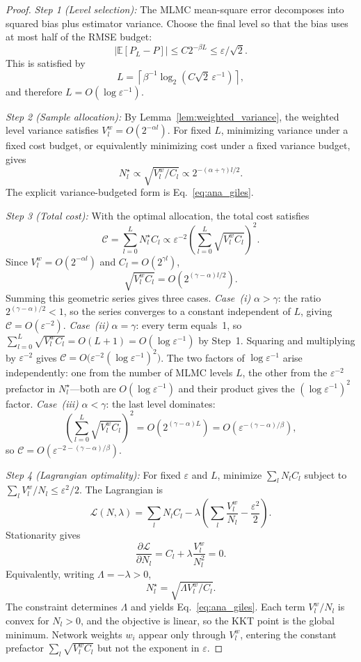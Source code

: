 \documentclass[journal]{IEEEtran}
\begin{document}
\begin{proof}
\textit{Step 1 (Level selection):}
The MLMC mean-square error decomposes into squared bias plus estimator variance. Choose the final
level so that the bias uses at most half of the RMSE budget:
\[
|\mathbb{E}[P_L-P]| \leq C2^{-\beta L}\leq \varepsilon/\sqrt{2}.
\]
This is satisfied by
\[
L=\left\lceil \beta^{-1}\log_2(C\sqrt{2}\,\varepsilon^{-1})\right\rceil,
\]
and therefore $L=O(\log\varepsilon^{-1})$.

\textit{Step 2 (Sample allocation):}
By Lemma~\ref{lem:weighted_variance}, the weighted level variance satisfies
$V_l^w=O(2^{-\alpha l})$. For fixed $L$, minimizing variance under a fixed cost budget, or
equivalently minimizing cost under a fixed variance budget, gives
\[
N_l^\star \propto \sqrt{V_l^w/C_l}
\propto 2^{-(\alpha+\gamma)l/2}.
\]
The explicit variance-budgeted form is Eq.~\eqref{eq:ana_giles}.

\textit{Step 3 (Total cost):}
With the optimal allocation, the total cost satisfies
\[
\mathcal{C}=\sum_{l=0}^{L}N_l^\star C_l
\propto \varepsilon^{-2}\left(\sum_{l=0}^{L}\sqrt{V_l^w C_l}\right)^2.
\]
Since $V_l^w=O(2^{-\alpha l})$ and $C_l=O(2^{\gamma l})$,
\[
\sqrt{V_l^w C_l}=O\!\left(2^{(\gamma-\alpha)l/2}\right).
\]
Summing this geometric series gives three cases.
\textit{Case~(i)} $\alpha>\gamma$: the ratio $2^{(\gamma-\alpha)/2}<1$, so the series
converges to a constant independent of $L$, giving $\mathcal{C}=O(\varepsilon^{-2})$.
\textit{Case~(ii)} $\alpha=\gamma$: every term equals~1, so
$\sum_{l=0}^L\sqrt{V_l^w C_l}=O(L+1)=O(\log\varepsilon^{-1})$ by Step~1.
Squaring and multiplying by $\varepsilon^{-2}$ gives
$\mathcal{C}=O\!\bigl(\varepsilon^{-2}(\log\varepsilon^{-1})^2\bigr)$.
The two factors of $\log\varepsilon^{-1}$ arise independently: one from the number
of MLMC levels $L$, the other from the $\varepsilon^{-2}$ prefactor in
$N_l^\star$---both are $O(\log\varepsilon^{-1})$ and their product gives the
$(\log\varepsilon^{-1})^2$ factor.
\textit{Case~(iii)} $\alpha<\gamma$: the last level dominates:
\[
\left(\sum_{l=0}^{L}\sqrt{V_l^wC_l}\right)^2
=O\!\left(2^{(\gamma-\alpha)L}\right)
=O\!\left(\varepsilon^{-(\gamma-\alpha)/\beta}\right),
\]
so $\mathcal{C}=O(\varepsilon^{-2-(\gamma-\alpha)/\beta})$.

\textit{Step 4 (Lagrangian optimality):}
For fixed $\varepsilon$ and $L$, minimize $\sum_l N_lC_l$ subject to
$\sum_l V_l^w/N_l\leq\varepsilon^2/2$. The Lagrangian is
\[
\mathcal{L}(N,\lambda)=
\sum_l N_lC_l-\lambda\left(\sum_l\frac{V_l^w}{N_l}-\frac{\varepsilon^2}{2}\right).
\]
Stationarity gives
\[
\frac{\partial\mathcal{L}}{\partial N_l}
=C_l+\lambda\frac{V_l^w}{N_l^2}=0.
\]
Equivalently, writing $\Lambda=-\lambda>0$,
\[
N_l^\star=\sqrt{\Lambda V_l^w/C_l}.
\]
The constraint determines $\Lambda$ and yields Eq.~\eqref{eq:ana_giles}. Each term
$V_l^w/N_l$ is convex for $N_l>0$, and the objective is linear, so the KKT point is the global
minimum. Network weights $w_i$ appear only through $V_l^w$, entering the constant prefactor
$\sum_l\sqrt{V_l^wC_l}$ but not the exponent in $\varepsilon$.
\end{proof}
\end{document}
